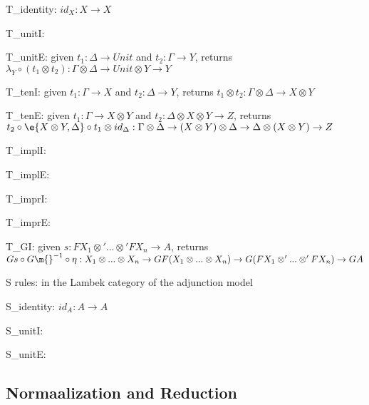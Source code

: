 T\_identity: $id_X:X\rightarrow X$

T\_unitI: 

T\_unitE: given $t_1:\Delta\rightarrow Unit$ and $t_2:\Gamma\rightarrow Y$, returns
$\lambda_Y\circ(t_1\otimes t_2):\Gamma\otimes\Delta\rightarrow Unit\otimes Y\rightarrow Y$

T\_tenI: given $t_1:\Gamma\rightarrow X$ and $t_2:\Delta\rightarrow Y$, returns
$t_1\otimes t_2:\Gamma\otimes\Delta\rightarrow X\otimes Y$

T\_tenE: given $t_1:\Gamma\rightarrow X\otimes Y$ and
$t_2:\Delta\otimes X\otimes Y\rightarrow Z$, returns \\
$t_2\circ\e{X\otimes Y,\Delta}\circ t_1\otimes id_\Delta:\Gamma\otimes\Delta\rightarrow(X\otimes Y)\otimes\Delta\rightarrow\Delta\otimes(X\otimes Y)\rightarrow Z$

T\_implI:

T\_implE:

T\_imprI:

T\_imprE:

T\_GI: given $s:FX_1\otimes'...\otimes' FX_n\rightarrow A$, returns \\
$Gs\circ G\m{}^{-1}\circ\eta:X_1\otimes...\otimes X_n\rightarrow GF(X_1\otimes...\otimes X_n)\rightarrow G(FX_1\otimes'...\otimes'FX_n)\rightarrow GA$

S rules: in the Lambek category of the adjunction model

S\_identity: $id_A:A\rightarrow A$

S\_unitI:

S\_unitE:



\subsection{Normaalization and Reduction}


